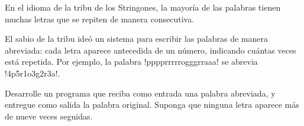 En el idioma de la tribu de los Stringones,
la mayoría de las palabras tienen muchas letras
que se repiten de manera consecutiva.

El sabio de la tribu ideó un sistema
para escribir las palabras de manera abreviada:
cada letra aparece antecedida de un número,
indicando cuántas veces está repetida.
Por ejemplo, la palabra \li!pppprrrrrogggrraaa!
se abrevia \li!4p5r1o3g2r3a!.

Desarrolle un programa
que reciba como entrada una palabra abreviada,
y entregue como salida la palabra original.
Suponga que ninguna letra
aparece más de nueve veces seguidas.


